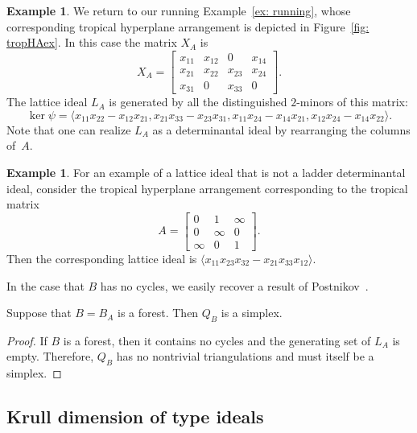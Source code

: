 \documentclass[11pt]{article}
\theoremstyle{definition}
\newtheorem{example}[theo]{Example}
\numberwithin{equation}{section}
\begin{document}
\begin{example}\label{ex: latticeIdealLadder}
We return to our running Example~\ref{ex: running}, whose corresponding tropical hyperplane arrangement is depicted in Figure~\ref{fig: tropHAex}. In this case the matrix $X_A$ is
\[X_A = \begin{bmatrix} x_{11} & x_{12} & 0 & x_{14}\\ x_{21} & x_{22} & x_{23} & x_{24} \\ x_{31} & 0 & x_{33} & 0 \end{bmatrix}.\]
The lattice ideal $L_A$ is generated by all the distinguished $2$-minors of this matrix:
$$
\ker\psi = \langle x_{11} x_{22} - x_{12} x_{21}, x_{21} x_{33} - x_{23} x_{31}, x_{11} x_{24} - x_{14} x_{21}, x_{12}x_{24} - x_{14}x_{22} \rangle.$$
Note that one can realize $L_A$ as a determinantal ideal by rearranging the columns of~$A$.
\end{example}

\begin{example}\label{ex: latticeIdealNonLadder}
For an example of a lattice ideal that is not a ladder determinantal ideal, consider the tropical hyperplane arrangement corresponding to the tropical matrix
\[A = \begin{bmatrix} 0 & 1 & \infty \\ 0 & \infty & 0 \\ \infty & 0 & 1 \end{bmatrix}.\]
Then the corresponding lattice ideal is
$
\langle x_{11} x_{23} x_{32} - x_{21} x_{33} x_{12}\rangle .
$
\end{example}

In the case that $B$ has no cycles, we easily recover a result of Postnikov~\cite[Lemma~12.5]{postnikov2009permutohedra}.

\begin{cor} Suppose that $B = B_A$ is a forest. Then $Q_B$ is a simplex.
\end{cor}

\begin{proof}
If $B$ is a forest, then it contains no cycles and the generating set of $L_A$ is empty. Therefore, $Q_B$ has no nontrivial triangulations and must itself be a simplex.
\end{proof}


\subsection{Krull dimension of type ideals} \label{sec: Krull}
\end{document}
